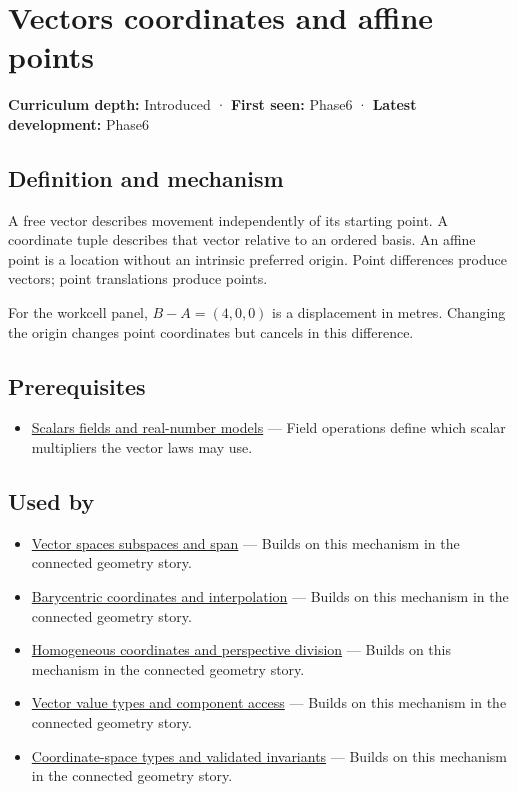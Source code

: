 \hypertarget{appendix-0659864c0aa3}{}\label{referencestart:appendix-0659864c0aa3}
\section{Vectors coordinates and affine points}\label{appendix-0659864c0aa3-vectors-coordinates-and-affine-points}

\textbf{Curriculum depth:} Introduced · \textbf{First seen:} Phase6 · \textbf{Latest development:} Phase6

\subsection{Definition and mechanism}\label{appendix-0659864c0aa3-definition-and-mechanism}

A free vector describes movement independently of its starting point. A coordinate tuple describes that vector relative to an ordered basis. An affine point is a location without an intrinsic preferred origin. Point differences produce vectors; point translations produce points.

For the workcell panel, \(B-A=(4,0,0)\) is a displacement in metres. Changing the origin changes point coordinates but cancels in this difference.

\subsection{Prerequisites}\label{appendix-0659864c0aa3-prerequisites}

\begin{itemize}
\tightlist
\item
  \hyperref[appendix-52051ad550fe]{Scalars fields and real-number models} --- Field operations define which scalar multipliers the vector laws may use.
\end{itemize}

\subsection{Used by}\label{appendix-0659864c0aa3-used-by}

\begin{itemize}
\tightlist
\item
  \hyperref[appendix-173b52c063ae]{Vector spaces subspaces and span} --- Builds on this mechanism in the connected geometry story.
\item
  \hyperref[appendix-02b9d9a81dca]{Barycentric coordinates and interpolation} --- Builds on this mechanism in the connected geometry story.
\item
  \hyperref[appendix-cb3b26862282]{Homogeneous coordinates and perspective division} --- Builds on this mechanism in the connected geometry story.
\item
  \hyperref[appendix-37a39984ba66]{Vector value types and component access} --- Builds on this mechanism in the connected geometry story.
\item
  \hyperref[appendix-380a220e2529]{Coordinate-space types and validated invariants} --- Builds on this mechanism in the connected geometry story.
\end{itemize}

